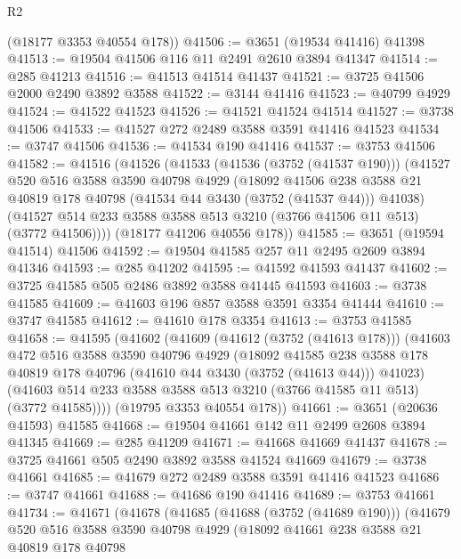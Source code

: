 \begin{lexlean}{R2}
\begin{coremodule}
      (@18177 @3353 @40554 @178))
@41506 := @3651 (@19534 @41416) @41398
@41513 := @19504 @41506 @116 @11 @2491 @2610 @3894 @41347
@41514 := @285 @41213
@41516 := @41513 @41514 @41437
@41521 := @3725 @41506 @2000 @2490 @3892 @3588
@41522 := @3144 @41416
@41523 := @40799 @4929
@41524 := @41522 @41523
@41526 := @41521 @41524 @41514
@41527 := @3738 @41506
@41533 := @41527 @272 @2489 @3588 @3591 @41416 @41523
@41534 := @3747 @41506
@41536 := @41534 @190 @41416
@41537 := @3753 @41506
@41582 := @41516
    (@41526
      (@41533
        (@41536 (@3752 (@41537 @190)))
        (@41527
          @520
          @516
          @3588
          @3590
          @40798
          @4929
          (@18092
            @41506
            @238
            @3588
            @21
            @40819
            @178
            @40798
            (@41534 @44 @3430 (@3752 (@41537 @44)))
            @41038)
          (@41527 @514 @233 @3588 @3588 @513 @3210 (@3766 @41506 @11 @513) (@3772 @41506))))
      (@18177 @41206 @40556 @178))
@41585 := @3651 (@19594 @41514) @41506
@41592 := @19504 @41585 @257 @11 @2495 @2609 @3894 @41346
@41593 := @285 @41202
@41595 := @41592 @41593 @41437
@41602 := @3725 @41585 @505 @2486 @3892 @3588 @41445 @41593
@41603 := @3738 @41585
@41609 := @41603 @196 @857 @3588 @3591 @3354 @41444
@41610 := @3747 @41585
@41612 := @41610 @178 @3354
@41613 := @3753 @41585
@41658 := @41595
    (@41602
      (@41609
        (@41612 (@3752 (@41613 @178)))
        (@41603
          @472
          @516
          @3588
          @3590
          @40796
          @4929
          (@18092
            @41585
            @238
            @3588
            @178
            @40819
            @178
            @40796
            (@41610 @44 @3430 (@3752 (@41613 @44)))
            @41023)
          (@41603 @514 @233 @3588 @3588 @513 @3210 (@3766 @41585 @11 @513) (@3772 @41585))))
      (@19795 @3353 @40554 @178))
@41661 := @3651 (@20636 @41593) @41585
@41668 := @19504 @41661 @142 @11 @2499 @2608 @3894 @41345
@41669 := @285 @41209
@41671 := @41668 @41669 @41437
@41678 := @3725 @41661 @505 @2490 @3892 @3588 @41524 @41669
@41679 := @3738 @41661
@41685 := @41679 @272 @2489 @3588 @3591 @41416 @41523
@41686 := @3747 @41661
@41688 := @41686 @190 @41416
@41689 := @3753 @41661
@41734 := @41671
    (@41678
      (@41685
        (@41688 (@3752 (@41689 @190)))
        (@41679
          @520
          @516
          @3588
          @3590
          @40798
          @4929
          (@18092
            @41661
            @238
            @3588
            @21
            @40819
            @178
            @40798

\end{coremodule}
\end{lexlean}
